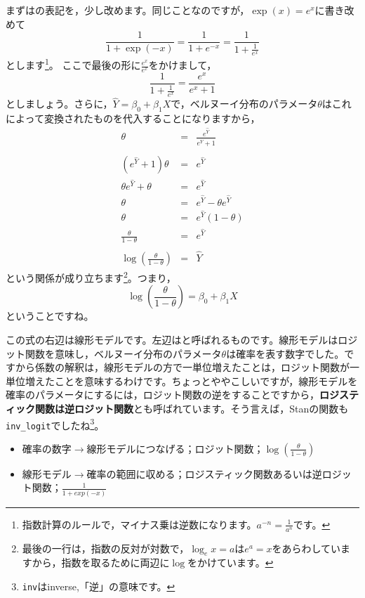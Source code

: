\documentclass{ltjsbook}
\begin{document}
まずはの表記を，少し改めます。同じことなのですが，$\exp(x) = e^x$に書き改めて
\[ \frac{1}{1+\exp(-x)} = \frac{1}{1+e^{-x}} = \frac{1}{1+\frac{1}{e^x}} \]
とします\footnote{指数計算のルールで，マイナス乗は逆数になります。$a^{-n}=\frac{1}{a^n}$です。}。
ここで最後の形に$\frac{e^x}{e^x}$をかけまして，
\[ \frac{1}{1+\frac{1}{e^x}}=\frac{e^x}{e^x+1} \]
としましょう。さらに，$\hat{Y} = \beta_0 + \beta_1 X$で，ベルヌーイ分布のパラメータ$\theta$はこれによって変換されたものを代入することになりますから，
\begin{eqnarray*}
	\theta &=& \frac{e^{\hat{Y}}}{e^{\hat{Y}}+1} \\
	&&\\
	(e^{\hat{Y}}+1)\theta & = & e^{\hat{Y}} \\
	\theta e^{\hat{Y}} + \theta &=& e^{\hat{Y}} \\
	\theta & = & e^{\hat{Y}} - \theta e^{\hat{Y}} \\
	\theta & = & e^{\hat{Y}}(1-\theta) \\
	\frac{\theta}{1-\theta} &=& e^{\hat{Y}}\\
	&&\\
	\log\left(\frac{\theta}{1-\theta}\right) &=& \hat{Y}
\end{eqnarray*}
という関係が成り立ちます\footnote{最後の一行は，指数の反対が対数で，$\log_e x=a$は$e^a=x$をあらわしていますから，指数を取るために両辺に$\log$をかけています。}。つまり，
\[ \log\left(\frac{\theta}{1-\theta}\right) =  \beta_0 + \beta_1 X \]
ということですね。

この式の右辺は線形モデルです。左辺はと呼ばれるものです。線形モデルはロジット関数を意味し，ベルヌーイ分布のパラメータ$\theta$は確率を表す数字でした。ですから係数の解釈は，線形モデルの方で一単位増えたことは，ロジット関数が一単位増えたことを意味するわけです。ちょっとややこしいですが，線形モデルを確率のパラメータにするには，ロジット関数の逆をすることですから，\textbf{ロジスティック関数は逆ロジット関数}とも呼ばれています。そう言えば，Stanの関数も\verb|inv_logit|でしたね\footnote{\texttt{inv}はinverse,「逆」の意味です。}。
\begin{itemize}
	\item 確率の数字$\to$線形モデルにつなげる；ロジット関数；$\log \left( \frac{\theta}{1-\theta} \right) $
	\item 線形モデル$\to$確率の範囲に収める；ロジスティック関数あるいは逆ロジット関数；$\frac{1}{1+exp(-x)}$
\end{itemize}
\end{document}
